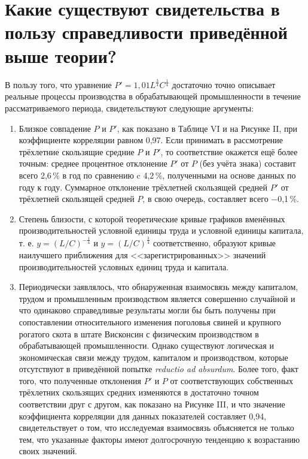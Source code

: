 \documentclass[leqno]{article}  %
\begin{document}
\section{Какие существуют свидетельства в пользу справедливости приведённой выше теории?}
В пользу того, что уравнение \(P'=1,01L^{\frac34}C^{\frac14}\) достаточно точно описывает реальные процессы производства в обрабатывающей промышленности в течение рассматриваемого периода, свидетельствуют следующие аргументы:
\begin{enumerate}[{(1)}]
\item Близкое совпадение \(P\) и \(P'\), как показано в Таблице VI и на Рисунке II, при коэффициенте корреляции равном 0,97. Если принимать в рассмотрение трёхлетние скользящие средние \(P\) и \(P'\), то соответствие окажется ещё более точным: среднее процентное отклонение \(P'\) от \(P\) (без учёта знака) составит всего 2,6\,\% в год по сравнению c 4,2\,\%, полученными на основе данных по году к году. Суммарное отклонение трёхлетней скользящей средней \(P'\) от трёхлетней скользящей средней \(P\), в свою очередь, составляет всего \(-\)0,1\,\%.
\par
\item Степень близости, с которой теоретические кривые графиков вменённых производительностей условной единицы труда и условной единицы капитала, т. е. \(y=(L/C)^{-\frac14}\) и \(y=(L/C)^{\frac34}\) соответственно, образуют кривые наилучшего приближения для <<зарегистрированных>> значений производительностей условных единиц труда и капитала.
\par
\item Периодически заявлялось, что обнаруженная взаимосвязь между капиталом, трудом и промышленным производством является совершенно случайной и что одинаково справедливые результаты могли бы быть получены при сопоставлении относительного изменения поголовья свиней и крупного рогатого скота в штате Висконсин с физическим производством в обрабатывающей промышленности. Однако существуют логическая и экономическая связи между трудом, капиталом и производством, которые отсутствуют в приведённой попытке \emph{reductio ad absurdum}. Более того, факт того, что полученные отклонения \(P'\) и \(P\) от соответствующих собственных трёхлетних скользящих средних изменяются в достаточно точном соответствии друг с другом, как показано на Рисунке III, и что значение коэффициента корреляции для данных показателей составляет 0,94, свидетельствует о том, что исследуемая взаимосвязь объясняется не только тем, что указанные факторы имеют долгосрочную тенденцию к возрастанию своих значений.

\end{enumerate}
\end{document}
